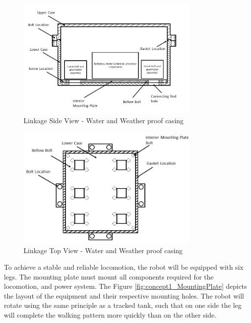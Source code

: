 \begin{figure}[H]
    \centering
    \includegraphics[width=0.8\textwidth]{img/C1/Case_Side.PNG}
    \caption{Linkage Side View - Water and Weather proof casing}
    \label{fig:concept1_CaseSide}
\end{figure}

\begin{figure}[H]
    \centering
    \includegraphics[width=0.8\textwidth]{img/C1/Case_Top.PNG}
    \caption{Linkage Top View - Water and Weather proof casing}
    \label{fig:concept1_CaseTop}
\end{figure}

To achieve a stable and reliable locomotion, the robot will be equipped with six legs. The mounting plate must mount all components required for the locomotion, and power system. The Figure \ref{fig:concept1_MountingPlate} depicts the layout of the equipment and their respective mounting holes. The robot will rotate using the same principle as a tracked tank, such that on one side the leg will complete the walking pattern more quickly than on the other side.


